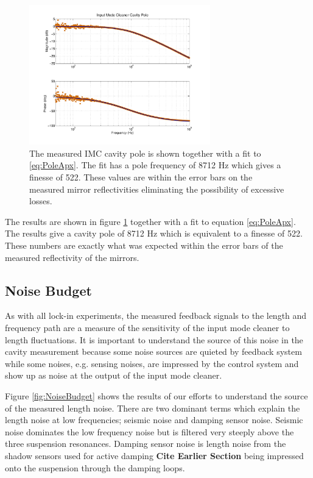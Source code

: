 \documentclass[10pt]{article}
\begin{document}
\begin{figure}[ht]
	\centering
	\includegraphics[width = 0.7\textwidth, trim = 2.5cm 1.5cm 2.5cm 1cm]{Cavity_Pole.pdf}
	\caption{The measured IMC cavity pole is shown together with a fit 
		to \eqref{eq:PoleApx}.  The fit has a pole frequency of 8712 Hz 
		which gives a finesse of 522.  These values are within the error 
		bars on the measured mirror reflectivities eliminating the 
		possibility of excessive losses.}
	\label{fig:cavPole}
\end{figure}

The results are shown in figure \ref{fig:cavPole} together with a fit to equation 
\eqref{eq:PoleApx}.  The results give a cavity pole of 8712 Hz which is equivalent 
to a finesse of 522.  
These numbers are exactly what was expected within the error bars of the measured 
reflectivity of the mirrors.  

\subsection{Noise Budget}

As with all lock-in experiments, the measured feedback signals to the length and 
frequency path are a measure of the sensitivity of the input mode cleaner to length 
fluctuations.  
It is important to understand the source of this noise in the cavity measurement because 
some noise sources are quieted by feedback system while some noises, e.g. sensing noises, 
are impressed by the control system and show up
as noise at the output of the input mode cleaner.  

Figure \ref{fig:NoiseBudget} shows the results of our efforts to understand the source 
of the measured length noise.  
There are two dominant terms which explain the length noise at low frequencies; 
seismic noise and damping sensor noise.  
Seismic noise dominates the low frequency noise but is filtered very steeply above the 
three suspension resonances.  
Damping sensor noise is length noise from the shadow sensors used for active damping
\textbf{Cite Earlier Section} being impressed onto the suspension through the damping loops.  
\end{document}
